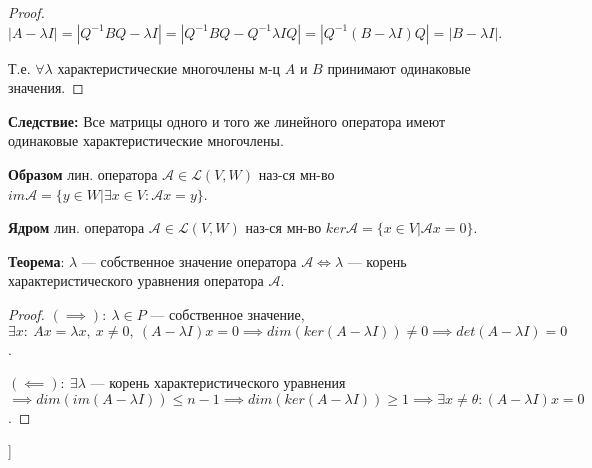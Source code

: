 \begin{proof}
$|A - \lambda I| = |Q^{-1} B Q - \lambda I| = |Q^{-1} B Q - Q^{-1} \lambda I Q| = |Q^{-1} (B - \lambda I) Q| = |B - \lambda I|$. 

Т.е. $\forall \lambda$ характеристические многочлены м-ц $A$ и $B$ принимают одинаковые значения.
\end{proof}

\textbf{Следствие:} Все матрицы одного и того же линейного оператора имеют одинаковые характеристические многочлены.

\bigbreak

\textbf{Образом} лин. оператора $\mathcal{A} \in \mathcal{L}(V, W)$ наз-ся мн-во $im\mathcal{A} = \{y \in W | \exists x \in V : \mathcal{A}x=y \}$.

\textbf{Ядром} лин. оператора $\mathcal{A} \in \mathcal{L}(V, W)$ наз-ся мн-во $ker\mathcal{A} = \{x \in V | \mathcal{A}x=0 \}$.

\textbf{Теорема}: $\lambda$ --- собственное значение оператора $\mathcal{A} \iff \lambda$ --- корень характеристического уравнения оператора $\mathcal{A}$.

\begin{proof}
 $(\implies):~\lambda \in P$ --- собственное значение, $\exists x:~Ax = \lambda x,~x\neq 0,~(A - \lambda I)x = 0 \implies
    dim(ker(A - \lambda I))\neq 0 \implies det(A - \lambda I) = 0$.

    $(\impliedby):~\exists\lambda$ --- корень характеристического уравнения $\implies dim(im(A - \lambda I))
    \leqslant n - 1 \implies dim(ker(A - \lambda I)) \geqslant 1 \implies \exists x\neq\theta : (A - \lambda I)x = 0$.
\end{proof}



\bigbreak
[\cite[page 240-260]{kim}]
